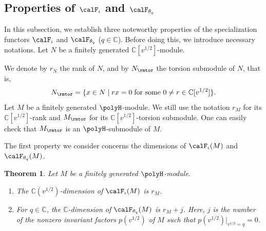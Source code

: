 \documentclass[12pt, reqno]{amsart}
\theoremstyle{plain}
\newtheorem{theorem}{Theorem}[section]
\theoremstyle{definition}
\numberwithin{equation}{section}
\numberwithin{figure}{section}
\numberwithin{table}{section}
\def\C{\mathbb C}
\begin{document}
\subsection{Properties of \texorpdfstring{$\calF_\iota$ and $\calF_{\theta_q}$}
{F iota and F theta q}}\label{subsec: properties of specialization functor}

In this subsection, we establish three noteworthy
properties of the specialization functors $\calF_\iota$ and  $\calF_{\theta_q}$ ($q \in \C$).
Before doing this, we introduce necessary notations.
Let $N$ be a finitely generated $\C[v^{1/2}]$-module.  



We denote by $r_N$ the rank of $N$,  and by $N_{\rmtor}$ the torsion submodule of $N$, that is,
\[
N_{\rmtor} = \{x \in N \mid r x = 0 \;\text{for some $0 \neq r \in \C[v^{1/2}]$} \}.
\]
Let $M$ be a finitely generated $\polyH$-module.
We still use  the notation $r_M$ for its $\C[v^{1/2}]$-rank and $M_{\rmtor}$ for its $\C[v^{1/2}]$-torsion submodule.
One can easily check that $M_{\rmtor}$ is an $\polyH$-submodule of $M$.





The first property  we consider concerns the dimensions of $\calF_\iota(M)$ and $\calF_{\theta_q}(M)$.









\begin{theorem}\label{thm: rank of tensored theta our cons}
Let $M$ be  a finitely generated  $\polyH$-module.
\begin{enumerate}[label = {\rm (\arabic*)}]
\item The $\C(v^{1/2})$-dimension of $\calF_\iota(M)$ is $r_M$.
\item For $q \in \C$, the $\C$-dimension of $\calF_{\theta_q} (M)$ is $r_M + j$.
Here, $j$ is the number of the nonzero invariant factors $p(v^{1/2})$ of $M$ such that $p(v^{1/2})|_{v^{1/2} = q} = 0$.
\end{enumerate}
\end{theorem}
\end{document}
